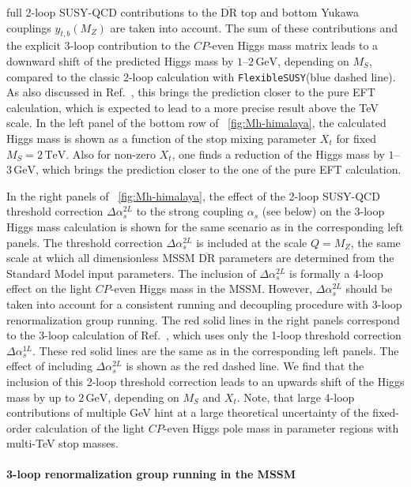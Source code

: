 \documentclass[final,3p,11pt,pdflatex]{elsarticle}
\makeatletter
\newcommand{\fs}{\texttt{FlexibleSUSY}\@\xspace}
\newcommand{\ol}[1]{\overline{#1}}
\newcommand{\DRbar}{\ensuremath{\ol{\text{DR}}}\xspace}
\newcommand{\unit}[1]{\,\text{#1}}      %
\newcommand{\MS}{\ensuremath{M_S}\xspace}
\newcommand{\figref}[1]{\figurename~\ref{#1}}
\newcommand{\CP}{\ensuremath{CP}\xspace}
\newcommand{\SQCD}{SUSY-QCD\xspace}
\def\as{\alpha_s}
\makeatother
\begin{document}
full 2-loop \SQCD contributions to the \DRbar top and bottom Yukawa
couplings $y_{t,b}(M_Z)$ \cite{Bednyakov:2007vm,Bednyakov:2002sf,Bednyakov:2005kt}
are taken into account.  The sum of these contributions
and the explicit 3-loop contribution to the \CP-even
Higgs mass matrix leads to a downward shift of the predicted Higgs
mass by $1$--$2\unit{GeV}$, depending on \MS, compared to the classic 2-loop
calculation with \fs (blue dashed line).  As also discussed in
Ref.~\cite{Harlander:2017kuc}, this brings the prediction closer to the pure
EFT calculation, which is expected to lead to a more precise result above
the TeV scale.  In the left panel of the bottom row of
\figref{fig:Mh-himalaya}, the calculated Higgs mass is shown as a
function of the stop mixing parameter $X_t$ for fixed
$\MS = 2\unit{TeV}$.  Also for non-zero
$X_t$, one finds a reduction of the Higgs mass by
$1$--$3\unit{GeV}$, which brings the prediction closer to the one of
the pure EFT calculation.

In the right panels of \figref{fig:Mh-himalaya}, the effect of the 2-loop
\SQCD threshold correction $\Delta\as^{2L}$
\cite{Harlander:2005wm,Bauer:2008bj,Bednyakov:2010ni} to the strong
coupling $\as$ (see below) on the 3-loop Higgs mass calculation is shown for
the same scenario as in the corresponding left panels.
The threshold correction $\Delta\as^{2L}$ is included at the scale
$Q = M_Z$, the same scale at which all dimensionless MSSM \DRbar
parameters are determined from the Standard Model input parameters.
The inclusion of $\Delta\as^{2L}$ is formally a 4-loop effect on the light
\CP-even Higgs mass in the MSSM\@.  However, $\Delta\as^{2L}$ should
be taken into account for a consistent running and decoupling
procedure with 3-loop renormalization group running.  The red solid
lines in the right panels correspond to the 3-loop calculation of
Ref.~\cite{Harlander:2017kuc}, which uses only the 1-loop threshold correction
$\Delta\as^{1L}$.  These red solid lines are the same as in the
corresponding left panels.  The effect of including
$\Delta\as^{2L}$ is shown as the red dashed line.  We find that the
inclusion of this 2-loop threshold correction leads to an upwards
shift of the Higgs mass by up to $2\unit{GeV}$, depending on \MS and
$X_t$.  Note, that large 4-loop contributions of multiple GeV hint at
a large theoretical uncertainty of the fixed-order calculation of the
light \CP-even Higgs pole mass in parameter regions with multi-TeV
stop masses.

\paragraph{3-loop renormalization group running in the MSSM}
\end{document}
